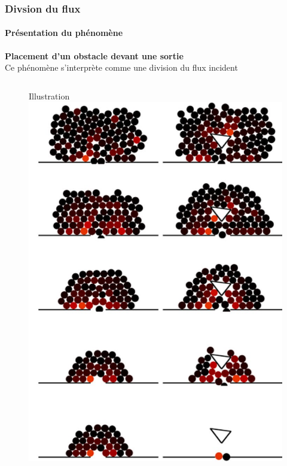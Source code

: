 \begin{frame}
    \frametitle{Divsion du flux}
    \framesubtitle{Présentation du phénomène}
    \textbf{Placement d'un obstacle devant une sortie} \\
    Ce phénomène s'interprète comme une division du flux incident
    \begin{columns}
        \begin{column}{0.475\textwidth}
            \begin{figure}
                Illustration
                \includegraphics[height=.58\textheight]{figures/Fig07}
            \end{figure}
        \end{column}
\end{columns}
\end{frame}
